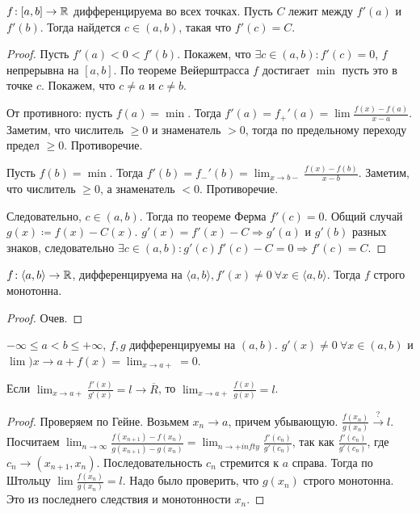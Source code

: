 \begin{theorem}
    $f\!:[a, b] \to \mathbb{R}$ дифференцируема во всех точках. Пусть  $C$ лежит между  $f'(a)$ и  $f'(b)$. Тогда найдется  $c \in (a, b)$, такая что  $f'(c) = C$.
\end{theorem}
\begin{proof}
    Пусть $f'(a) < 0 < f'(b)$. Покажем, что $\exists c \in (a, b)\!: f'(c) = 0$, $f$ непрерывна на  $[a, b]$. По теореме Вейерштрасса  $f$ достигает  $\min$ пусть это в точке $c$. Покажем, что  $c \neq a$ и  $c \neq b$. 

    От противного: пусть $f(a) = \min$. Тогда  $f'(a) = f_+'(a) = \lim \frac{f(x) - f(a)}{x-a}$. Заметим, что числитель  $\ge 0$ и знаменатель $> 0$, тогда по предельному переходу предел  $\ge 0$. Противоречие.

    Пусть $f(b) = \min$. Тогда  $f'(b) = f_-'(b) = \lim_{x \to b-} \frac{f(x) - f(b)}{x - b}$. Заметим, что  числитель  $\ge 0$, а знаменатель $<0$. Противоречие.
    
    Следовательно,  $c \in (a, b)$. Тогда по теореме Ферма  $f'(c) = 0$. Общий случай  $g(x) \coloneqq f(x) - C(x)$.  $g'(x) = f'(x) - C \Rightarrow g'(a)$ и  $g'(b)$ разных знаков, следовательно  $\exists c \in (a, b)\!: g'(c) f'(c) - C = 0 \Rightarrow f'(c) = C$.
\end{proof}
\begin{consequence}
    $f\!: \langle a, b \rangle \to \mathbb{R}$, дифференцируема на  $\langle a, b \rangle, f'(x) \neq 0\ \forall x \in \langle a, b \rangle $. Тогда  $f$ строго монотонна.
\end{consequence}
\begin{proof}
    Очев. 
\end{proof}
\begin{theorem}
    $-\infty \le a < b \le +\infty$, $f,g$ дифференцируемы на  $(a, b)$.  $g'(x) \neq 0\ \forall x \in (a, b)$ и $\lim){x \to a+} f(x) = \lim_{x \to a+} = 0$. 

    Если  $\lim_{x \to a+} \frac{f'(x)}{g'(x)} = l \to \overline{R}$, то $\lim_{x \to a+} \frac{f(x)}{g(x)} = l$. 
\end{theorem}
\begin{proof}
    Проверяем по Гейне. Возьмем $x_n \to a$, причем убывающую.  $\frac{f(x_n)}{g(x_n)} \xrightarrow{?} l$. Посчитаем $\lim_{n \to \infty} \frac{f(x_{n+1}) - f(x_n)}{g(x_{n+1}) - g(x_n)} = \lim_{n \to +infty} \frac{f'(c_n)}{g'(c_n)}$, так как $\frac{f'(c_n)}{g'(c_n)}$, где $c_n \to (x_{n+1}, x_n)$. Последовательность  $c_n$ стремится  к $a$ справа. Тогда по Штольцу $\lim \frac{f(x_n)}{g(x_n)} = l$. Надо было проверить, что $g(x_n)$ строго монотонна. Это из последнего следствия и монотонности $x_n$.
\end{proof}
